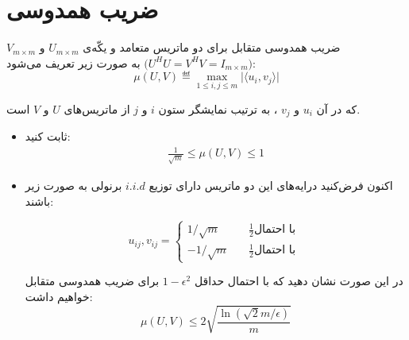 \section{ضریب همدوسی}
ضریب همدوسی متقابل برای دو ماتریس متعامد و یکّه‌ی
$U_{m\times m}$
و
$V_{m\times m}$
$\big(U^HU=V^HV=I_{m\times m}\big)$
به صورت زیر تعریف می‌شود:
\begin{equation}
\nonumber
\mu(U,V)\eqdef \max_{1\leq i,j\leq m}\big\lvert\langle u_i,v_j\rangle\big\rvert
\end{equation}

که در آن 
$u_i$
و
$v_j$
، به ترتیب نمایشگر ستون
$i$
و
$j$
از ماتریس‌های
$U$
و
$V$
است.

\begin{itemize}
\item
  ثابت کنید:
\begin{align}
\nonumber\frac{{1}}{\sqrt{m}}\leq \mu(U,V)\leq {1}
\end{align}
\item
 اکنون فرض‌کنید درایه‌های این دو ماتریس دارای توزیع 
$i.i.d$
برنولی به صورت زیر  باشند:

\[
u_{ij},v_{ij} = 
\begin{cases} 
{1/\sqrt{m}} &\quad \frac{1}{2} \text{با احتمال }\\
-{1/\sqrt{m}} &\quad \frac{1}{2} \text{با احتمال }
\end{cases}
\] 

در این صورت نشان دهید که با احتمال حداقل 
$1-\epsilon^{2}$
برای ضریب همدوسی متقابل خواهیم داشت:
\begin{equation}
\nonumber
\mu(U,V)\leq {2\sqrt{\frac{\ln{(\sqrt{2}m/\epsilon)}}{m}}}
\end{equation}
\end{itemize}